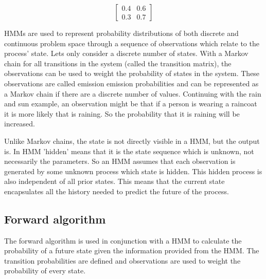 \documentclass[12pt, a4paper]{article}
\begin{document}
\begin{equation}\label{eq:matrix}
\begin{bmatrix}
       0.4 & 0.6\\
       0.3 & 0.7
\end{bmatrix}
\end{equation}

HMMs are used to represent probability distributions of both discrete and continuous problem space through a sequence of observations which relate to the process' state. Lets only consider a discrete number of states. With a Markov chain for all transitions in the system (called the transition matrix), the observations can be used to weight the probability of states in the system. These observations are called emission emission probabilities and can be represented as a Markov chain if there are a discrete number of values\cite{hmm}\cite{MA-hmm}. Continuing with the rain and sun example, an observation might be that if a person is wearing a raincoat it is more likely that is raining. So the probability that it is raining will be increased.

Unlike Markov chains, the state is not directly visible in a HMM, but the output is. In HMM 'hidden' means that it is the state sequence which is unknown, not necessarily the parameters. So an HMM assumes that each observation is generated by some unknown process which state is hidden. This hidden process is also independent of all prior states. This means that the current state encapsulates all the history needed to predict the future of the process\cite{hmm}\cite{MA-hmm}.


\subsection{Forward algorithm}

The forward algorithm is used in conjunction with a HMM to calculate the probability of a future state given the information provided from the HMM. The transition probabilities are defined and observations are used to weight the probability of every state.  
\end{document}
